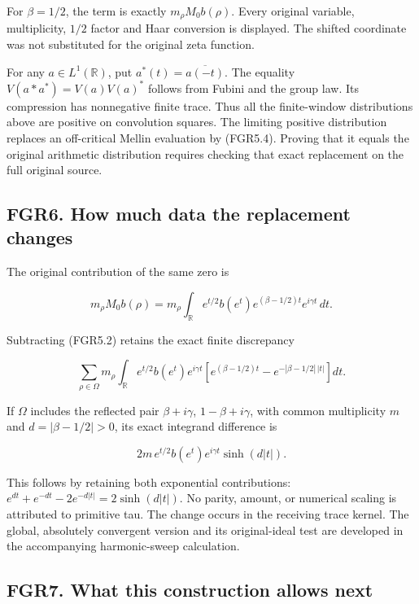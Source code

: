 For \(\beta=1/2\), the term is exactly \(m_\rho M_0b(\rho)\). Every
original variable, multiplicity, \(1/2\) factor and Haar conversion is
displayed. The shifted coordinate was not substituted for the original
zeta function.

For any \(a\in L^1(\mathbb R)\), put \(a^*(t)=\overline{a(-t)}\). The
equality \(V(a*a^*)=V(a)V(a)^*\) follows from Fubini and the group law.
Its compression has nonnegative finite trace. Thus all the finite-window
distributions above are positive on convolution squares. The limiting
positive distribution replaces an off-critical Mellin evaluation by
(FGR5.4). Proving that it equals the original arithmetic distribution
requires checking that exact replacement on the full original source.

\subsection{FGR6. How much data the replacement
changes}\label{fgr6.-how-much-data-the-replacement-changes}

The original contribution of the same zero is

\[
 m_\rho M_0b(\rho)
 =m_\rho\int_{\mathbb R}e^{t/2}b(e^t)
                  e^{(\beta-1/2)t}e^{i\gamma t}\,dt.
\tag{FGR6.1}
\]

Subtracting (FGR5.2) retains the exact finite discrepancy

\[
 \sum_{\rho\in\Omega}m_\rho\int_{\mathbb R}e^{t/2}b(e^t)e^{i\gamma t}
 \left[e^{(\beta-1/2)t}-e^{-|\beta-1/2|\,|t|}\right]dt.
\tag{FGR6.2}
\]

If \(\Omega\) includes the reflected pair \(\beta+i\gamma\),
\(1-\beta+i\gamma\), with common multiplicity \(m\) and
\(d=|\beta-1/2|>0\), its exact integrand difference is

\[
 2m\,e^{t/2}b(e^t)e^{i\gamma t}\sinh(d|t|).
\tag{FGR6.3}
\]

This follows by retaining both exponential contributions:
\(e^{dt}+e^{-dt}-2e^{-d|t|}=2\sinh(d|t|)\). No parity, amount, or
numerical scaling is attributed to primitive tau. The change occurs in
the receiving trace kernel. The global, absolutely convergent version
and its original-ideal test are developed in the accompanying
harmonic-sweep calculation.

\subsection{FGR7. What this construction allows
next}\label{fgr7.-what-this-construction-allows-next}

